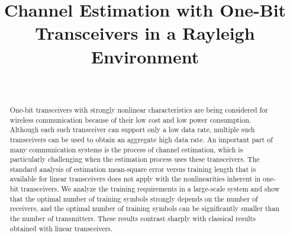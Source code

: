 \documentclass[conference]{IEEEtran}
\begin{document}
\title{Channel Estimation with One-Bit Transceivers in a Rayleigh Environment}
\author{\\
}


\maketitle

\begin{abstract}
One-bit transceivers with strongly nonlinear characteristics are being considered for wireless communication because of their low cost and low power consumption.  Although each such transceiver can support only a low data rate, multiple such transceivers can be used to obtain an aggregate high data rate.  An important part of many communication systems is the process of channel estimation, which is particularly challenging when the estimation process uses these transceivers.  The standard analysis of estimation mean-square error versus training length that is available for linear transceivers does not apply with the nonlinearities inherent in one-bit transceivers.  We analyze the training requirements in a large-scale system and show that the optimal number of training symbols strongly depends on the number of receivers, and the optimal number of training symbols can be significantly smaller than the number of transmitters.  These results contrast sharply with classical results obtained with linear transceivers.

\end{abstract}

\IEEEpeerreviewmaketitle
\end{document}
